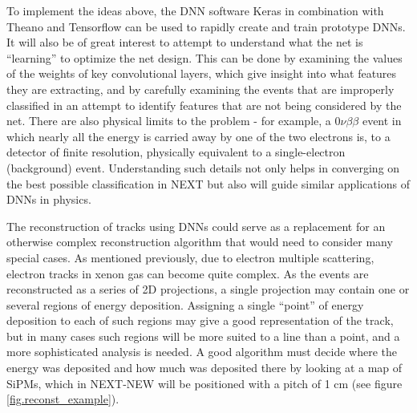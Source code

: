 \documentclass[11pt,a4paper]{article}
\begin{document}
To implement the ideas above, the DNN software Keras \cite{Keras} in combination with Theano \cite{Theano} and Tensorflow \cite{Tensorflow} can be used to rapidly create and train prototype DNNs. It will also be of great interest to attempt to understand what the net is ``learning'' to optimize the net design. This can be done by examining the values of the weights of key convolutional layers, which give insight into what features they are extracting, and by carefully examining the events that are improperly classified in an attempt to identify features that are not being considered by the net. There are also physical limits to the problem - for example, a $0\nu\beta\beta$ event in which nearly all the energy is carried away by one of the two electrons is, to a detector of finite resolution, physically equivalent to a single-electron (background) event. Understanding such details not only helps in converging on the best possible classification in NEXT but also will guide similar applications of DNNs in physics.

The reconstruction of tracks using DNNs could serve as a replacement for an otherwise complex reconstruction algorithm that would need to consider many special cases. As mentioned previously, due to electron multiple scattering, electron tracks in xenon gas can become quite complex. As the events are reconstructed as a series of 2D projections, a single projection may contain one or several regions of energy deposition. Assigning a single ``point'' of energy deposition to each of such regions may give a good representation of the track, but in many cases such regions will be more suited to a line than a point, and a more sophisticated analysis is needed. A good algorithm must decide where the energy was deposited and how much was deposited there by looking at a map of SiPMs, which in NEXT-NEW will be positioned with a pitch of 1 cm (see figure \ref{fig.reconst_example}).
\end{document}
